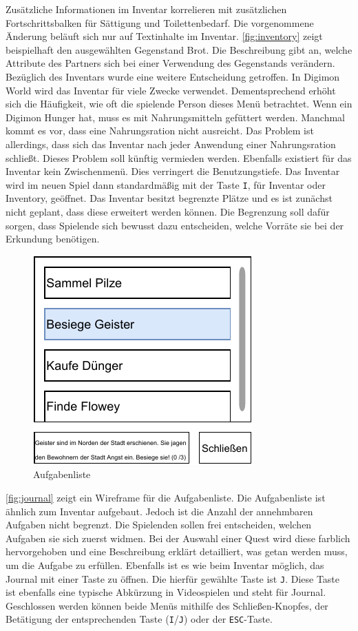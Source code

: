 Zusätzliche Informationen im Inventar korrelieren mit zusätzlichen Fortschrittsbalken für Sättigung und Toilettenbedarf.
Die vorgenommene Änderung beläuft sich nur auf Textinhalte im Inventar.
\autoref{fig:inventory} zeigt beispielhaft den ausgewählten Gegenstand Brot.
Die Beschreibung gibt an, welche Attribute des Partners sich bei einer Verwendung des Gegenstands verändern.
Bezüglich des Inventars wurde eine weitere Entscheidung getroffen.
In Digimon World wird das Inventar für viele Zwecke verwendet.
Dementsprechend erhöht sich die Häufigkeit, wie oft die spielende Person dieses Menü betrachtet.
Wenn ein Digimon Hunger hat, muss es mit Nahrungsmitteln gefüttert werden.
Manchmal kommt es vor, dass eine Nahrungsration nicht ausreicht.
Das Problem ist allerdings, dass sich das Inventar nach jeder Anwendung einer Nahrungsration schließt.
Dieses Problem soll künftig vermieden werden.
Ebenfalls existiert für das Inventar kein Zwischenmenü.
Dies verringert die Benutzungstiefe.
Das Inventar wird im neuen Spiel dann standardmäßig mit der Taste \texttt{I}, für Inventar oder Inventory, geöffnet.
Das Inventar besitzt begrenzte Plätze und es ist zunächst nicht geplant, dass diese erweitert werden können.
Die Begrenzung soll dafür sorgen, dass Spielende sich bewusst dazu entscheiden, welche Vorräte sie bei der Erkundung benötigen.\\

\begin{figure}[H]
    \centering
    \includegraphics[width=0.5\columnwidth]{figures/wireframes/journal.pdf}
    \caption{\label{fig:journal}Aufgabenliste}
\end{figure}

\autoref{fig:journal} zeigt ein Wireframe für die Aufgabenliste.
Die Aufgabenliste ist ähnlich zum Inventar aufgebaut.
Jedoch ist die Anzahl der annehmbaren Aufgaben nicht begrenzt.
Die Spielenden sollen frei entscheiden, welchen Aufgaben sie sich zuerst widmen.
Bei der Auswahl einer Quest wird diese farblich hervorgehoben und eine Beschreibung erklärt detailliert, was getan werden muss, um die Aufgabe zu erfüllen.
Ebenfalls ist es wie beim Inventar möglich, das Journal mit einer Taste zu öffnen.
Die hierfür gewählte Taste ist \texttt{J}.
Diese Taste ist ebenfalls eine typische Abkürzung in Videospielen und steht für Journal.
Geschlossen werden können beide Menüs mithilfe des Schließen-Knopfes, der Betätigung der entsprechenden Taste (\texttt{I}/\texttt{J}) oder der \texttt{ESC}-Taste.\\

